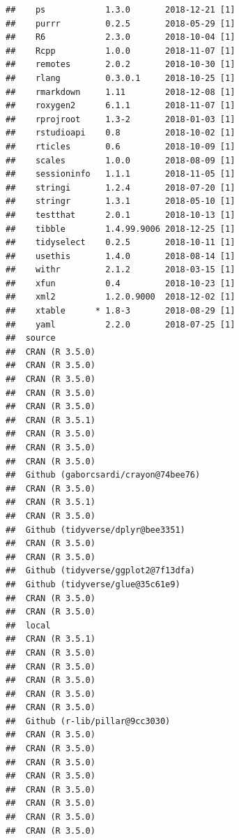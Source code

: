 \documentclass[]{elsarticle} %
\begin{document}
\begin{verbatim}
##    ps            1.3.0       2018-12-21 [1]
##    purrr         0.2.5       2018-05-29 [1]
##    R6            2.3.0       2018-10-04 [1]
##    Rcpp          1.0.0       2018-11-07 [1]
##    remotes       2.0.2       2018-10-30 [1]
##    rlang         0.3.0.1     2018-10-25 [1]
##    rmarkdown     1.11        2018-12-08 [1]
##    roxygen2      6.1.1       2018-11-07 [1]
##    rprojroot     1.3-2       2018-01-03 [1]
##    rstudioapi    0.8         2018-10-02 [1]
##    rticles       0.6         2018-10-09 [1]
##    scales        1.0.0       2018-08-09 [1]
##    sessioninfo   1.1.1       2018-11-05 [1]
##    stringi       1.2.4       2018-07-20 [1]
##    stringr       1.3.1       2018-05-10 [1]
##    testthat      2.0.1       2018-10-13 [1]
##    tibble        1.4.99.9006 2018-12-25 [1]
##    tidyselect    0.2.5       2018-10-11 [1]
##    usethis       1.4.0       2018-08-14 [1]
##    withr         2.1.2       2018-03-15 [1]
##    xfun          0.4         2018-10-23 [1]
##    xml2          1.2.0.9000  2018-12-02 [1]
##    xtable      * 1.8-3       2018-08-29 [1]
##    yaml          2.2.0       2018-07-25 [1]
##  source                             
##  CRAN (R 3.5.0)                     
##  CRAN (R 3.5.0)                     
##  CRAN (R 3.5.0)                     
##  CRAN (R 3.5.0)                     
##  CRAN (R 3.5.0)                     
##  CRAN (R 3.5.1)                     
##  CRAN (R 3.5.0)                     
##  CRAN (R 3.5.0)                     
##  CRAN (R 3.5.0)                     
##  Github (gaborcsardi/crayon@74bee76)
##  CRAN (R 3.5.0)                     
##  CRAN (R 3.5.1)                     
##  CRAN (R 3.5.0)                     
##  Github (tidyverse/dplyr@bee3351)   
##  CRAN (R 3.5.0)                     
##  CRAN (R 3.5.0)                     
##  Github (tidyverse/ggplot2@7f13dfa) 
##  Github (tidyverse/glue@35c61e9)    
##  CRAN (R 3.5.0)                     
##  CRAN (R 3.5.0)                     
##  local                              
##  CRAN (R 3.5.1)                     
##  CRAN (R 3.5.0)                     
##  CRAN (R 3.5.0)                     
##  CRAN (R 3.5.0)                     
##  CRAN (R 3.5.0)                     
##  CRAN (R 3.5.0)                     
##  Github (r-lib/pillar@9cc3030)      
##  CRAN (R 3.5.0)                     
##  CRAN (R 3.5.0)                     
##  CRAN (R 3.5.0)                     
##  CRAN (R 3.5.0)                     
##  CRAN (R 3.5.0)                     
##  CRAN (R 3.5.0)                     
##  CRAN (R 3.5.0)                     
##  CRAN (R 3.5.0)                     

\end{verbatim}
\end{document}
